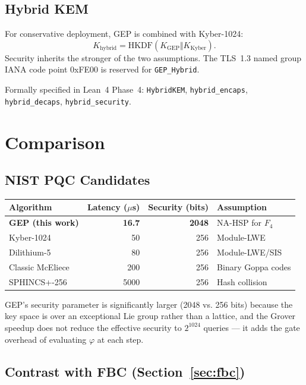 \documentclass[11pt,letterpaper]{article}
\theoremstyle{definition}
\begin{document}
\subsection{Hybrid KEM}

For conservative deployment, GEP is combined with Kyber-1024:
\[
K_{\mathrm{hybrid}} = \mathrm{HKDF}(K_{\mathrm{GEP}} \Vert K_{\mathrm{Kyber}}).
\]
Security inherits the stronger of the two assumptions.  The TLS~1.3 named group
IANA code point 0xFE00 is reserved for \texttt{GEP\_Hybrid}.

Formally specified in Lean~4 Phase~4:
\texttt{HybridKEM}, \texttt{hybrid\_encaps}, \texttt{hybrid\_decaps},
\texttt{hybrid\_security}.

\section{Comparison}
\label{sec:comparison}

\subsection{NIST PQC Candidates}

\begin{center}
\begin{tabular}{lrrl}
\toprule
Algorithm & Latency ($\mu$s) & Security (bits) & Assumption \\
\midrule
\textbf{GEP (this work)} & \textbf{16.7} & \textbf{2048} & NA-HSP for $F_4$ \\
Kyber-1024 & 50 & 256 & Module-LWE \\
Dilithium-5 & 80 & 256 & Module-LWE/SIS \\
Classic McEliece & 200 & 256 & Binary Goppa codes \\
SPHINCS+-256 & 5000 & 256 & Hash collision \\
\bottomrule
\end{tabular}
\end{center}

GEP's security parameter is significantly larger (2048 vs. 256 bits) because the
key space is over an exceptional Lie group rather than a lattice, and the Grover
speedup does not reduce the effective security to $2^{1024}$ queries — it adds
the gate overhead of evaluating $\varphi$ at each step.

\subsection{Contrast with FBC (Section~\ref{sec:fbc})}
\end{document}

